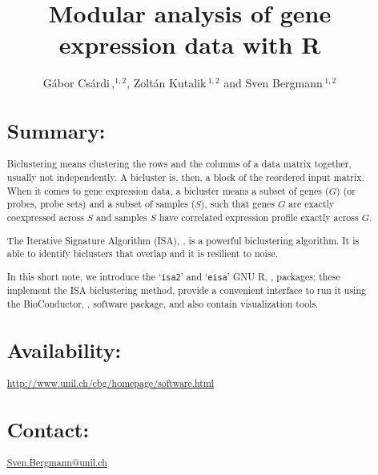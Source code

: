 \documentclass{bioinfo}
\newcommand{\Rpackage}[1]{`\texttt{#1}'}
\begin{document}

\title[Modular analysis]{Modular analysis of gene expression data with R}
\author[G\'abor Cs\'ardi \textit{et~al}]{G\'abor Cs\'ardi\,,$^{1,2}$,
  Zolt\'an Kutalik\,$^{1,2}$ and Sven Bergmann\,$^{1,2}$}
\address{$^{1}$Department of Medical Genetics, and 
  $^{2}$Swiss Institute of Bioinformatics,
  University of Lausanne, Rue de Bugnon 27, CH-1005 Lausanne,
  Switzerland.}



\maketitle

\begin{abstract}
\section{Summary:} 
Biclustering means clustering the rows and the columns of a
data matrix together, usually not independently. A bicluster is, then,
a block of the reordered input matrix. When it comes to gene
expression data, a bicluster means a subset of genes ($G$) (or probes,
probe sets) and a subset of samples ($S$), such that genes $G$ are
exactly coexpressed across $S$ and samples $S$ have correlated
expression profile exactly across $G$. 

The Iterative Signature Algorithm (ISA), \cite{sa,isa}, is a 
powerful biclustering algorithm. It is able to identify biclusters
that overlap and it is resilient to noise.

In this short note, we introduce the \Rpackage{isa2} and
\Rpackage{eisa} GNU R, \cite{R}, packages; these implement the ISA
biclustering method, provide a convenient interface to run it using
the BioConductor, \cite{BioC}, software package, and also contain
visualization tools.

\section{Availability:}
\href{http://www.unil.ch/cbg/homepage/software.html}%
{http://www.unil.ch/cbg/homepage/software.html}
\section{Contact:} \href{Sven.Bergmann@unil.ch}{Sven.Bergmann@unil.ch}
\end{abstract}
\end{document}
